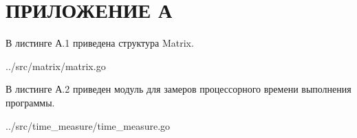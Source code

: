 \chapter*{ПРИЛОЖЕНИЕ А}

В листинге А.1 приведена структура Matrix.

\captionsetup[lstlisting]{format=leftalign, labelformat=mylabelformat1, labelsep=none}
\begin{lstinputlisting}[
	caption={Структура Matrix},
	label={lst:matrix},
	style={go},
	]{../src/matrix/matrix.go}
\end{lstinputlisting}

В листинге А.2 приведен модуль для замеров процессорного времени выполнения программы.
\captionsetup[lstlisting]{format=leftalign, labelformat=mylabelformat2, labelsep=none}
\begin{lstinputlisting}[
	caption={Измерение времени},
	label={lst:time},
	style={go},
	]{../src/time\_measure/time\_measure.go}
\end{lstinputlisting}